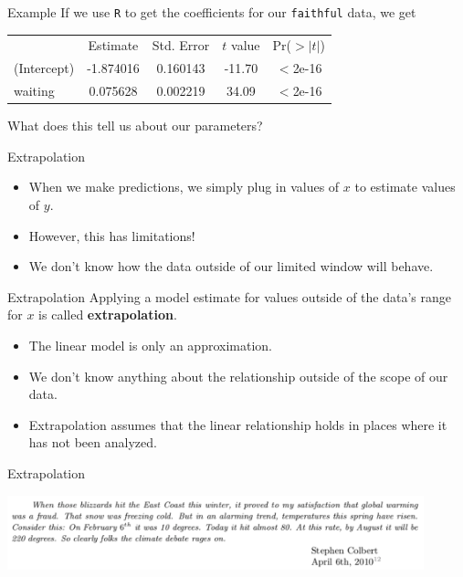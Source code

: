 \begin{frame}{Example}
    If we use \texttt{R} to get the coefficients for our \texttt{faithful} data, we get
    \begin{table}[h]
        \centering
        \begin{tabular}{l cccc}
             & Estimate & Std. Error & $t$ value & Pr($>|t|$) \\
            (Intercept) & -1.874016 &  0.160143 & -11.70 &  $<$2e-16 \\
            waiting     & 0.075628  & 0.002219 &  34.09  & $<$2e-16
        \end{tabular}
    \end{table}
    What does this tell us about our parameters?
\end{frame}

\begin{frame}{Extrapolation}
    \begin{itemize}
        \item When we make predictions, we simply plug in values of $x$ to estimate values of $y$. 
        \item However, this has limitations!
        \item We don't know how the data outside of our limited window will behave.
    \end{itemize}
\end{frame}

\begin{frame}{Extrapolation}
    Applying a model estimate for values outside of the data's range for $x$ is called \textbf{extrapolation}.
    \begin{itemize}
        \item The linear model is only an approximation.
        \item We don't know anything about the relationship outside of the scope of our data.
        \item Extrapolation assumes that the linear relationship holds in places where it has not been analyzed.
    \end{itemize}
\end{frame}

\begin{frame}{Extrapolation}
    \begin{center}
        \includegraphics[width=4.75in]{images/colbert.png}
    \end{center}
\end{frame}

